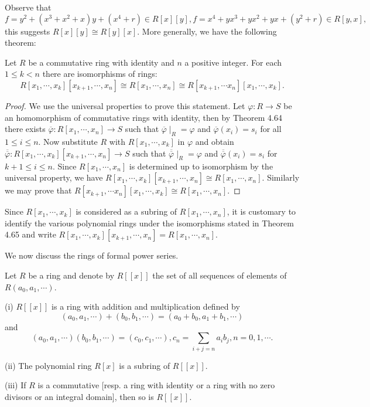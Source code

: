 Observe that 
$$
f=y^2+\left( x^3+x^2+x \right) y+\left( x^4+r \right) \in R\left[ x \right] \left[ y \right] ,f=x^4+yx^3+yx^2+yx+\left( y^2+r \right) \in R\left[ y,x \right] ,
$$
this suggests $R[x][y]\cong R[y][x]$. More generally, we have the following theorem: 
\begin{theorem}
Let $R$ be a commutative ring with identity and $n$ a positive integer. For each $1\le k<n$ there are isomorphisms of rings: 
$$
R\left[ x_1,\cdots ,x_k \right] \left[ x_{k+1},\cdots ,x_n \right] \cong R\left[ x_1,\cdots ,x_n \right] \cong R\left[ x_{k+1},\cdots x_n \right] \left[ x_1,\cdots ,x_k \right] .
$$
\end{theorem}
\begin{proof}
We use the universal properties to prove this statement. Let $\varphi:R\to S$ be an homomorphism of commutative rings with identity, then by Theorem 4.64 there exists $\overline{\varphi}:R[x_1,\cdots,x_n]\to S$ such that $\overline{\varphi}\mid_R=\varphi$ and $\overline{\varphi}(x_i)=s_i$ for all $1\le i\le n$. Now substitute $R$ with $R[x_1,\cdots,x_k]$ in $\varphi$ and obtain $\overline{\overline{\varphi}}:R[x_1,\cdots,x_k][x_{k+1},\cdots,x_n]\to S$ such that $\overline{\overline{\varphi}}\mid_R=\varphi$ and $\overline{\overline{\varphi}}(x_i)=s_i$ for $k+1\le i\le n$. Since $R[x_1,\cdots,x_n]$ is determined up to isomorphism by the universal property, we have $R\left[ x_1,\cdots ,x_k \right] \left[ x_{k+1},\cdots ,x_n \right] \cong R\left[ x_1,\cdots ,x_n \right] $. Similarly we may prove that $R\left[ x_{k+1},\cdots x_n \right] \left[ x_1,\cdots ,x_k \right] \cong R\left[ x_1,\cdots ,x_n \right] $.
\end{proof}
Since $R[x_1,\cdots,x_k]$ is considered as a subring of $R[x_1,\cdots,x_n]$, it is customary to identify the various polynomial rings under the isomorphisms stated in Theorem 4.65 and write $R[x_1,\cdots,x_k][x_{k+1},\cdots,x_n]=R[x_1,\cdots,x_n]$.\par
We now discuss the rings of formal power series.
\begin{theorem}
Let $R$ be a ring and denote by $R[[x]]$ the set of all sequences of elements of $R(a_0,a_1,\cdots)$.\par
(i) $R[[x]]$ is a ring with addition and multiplication defined by 
$$
\left( a_0,a_1,\cdots \right) +\left( b_0,b_1,\cdots \right) =\left( a_0+b_0,a_1+b_1,\cdots \right) 
$$
and 
$$
\left( a_0,a_1,\cdots \right) \left( b_0,b_1,\cdots \right) =\left( c_0,c_1,\cdots \right) ,c_n=\sum_{i+j=n}{a_ib_j},n=0,1,\cdots .
$$\par
(ii) The polynomial ring $R[x]$ is a subring of $R[[x]]$.\par
(iii) If $R$ is a commutative [resp. a ring with identity or a ring with no zero divisors or an integral domain], then so is $R[[x]]$.
\end{theorem}
